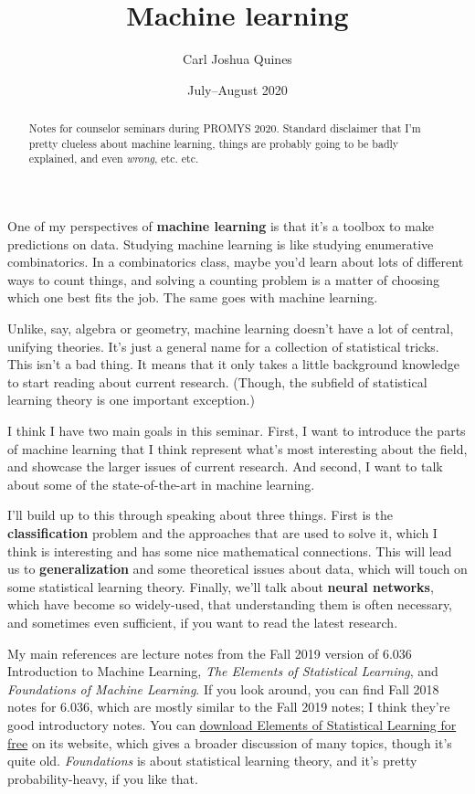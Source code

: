 \documentclass[11pt,paper=letter]{scrartcl}
\begin{document}
\title{Machine learning}
\author{Carl Joshua Quines}
\date{July--August 2020}

\maketitle

\begin{abstract}
Notes for counselor seminars during PROMYS 2020. Standard disclaimer that I'm pretty clueless about machine learning, things are probably going to be badly explained, and even \textit{wrong}, etc. etc.
\end{abstract}

One of my perspectives of \textbf{machine learning} is that it's a toolbox to make predictions on data. Studying machine learning is like studying enumerative combinatorics. In a combinatorics class, maybe you'd learn about lots of different ways to count things, and solving a counting problem is a matter of choosing which one best fits the job. The same goes with machine learning.

Unlike, say, algebra or geometry, machine learning doesn't have a lot of central, unifying theories. It's just a general name for a collection of statistical tricks. This isn't a bad thing. It means that it only takes a little background knowledge to start reading about current research. (Though, the subfield of statistical learning theory is one important exception.)

I think I have two main goals in this seminar. First, I want to introduce the parts of machine learning that I think represent what's most interesting about the field, and showcase the larger issues of current research. And second, I want to talk about some of the state-of-the-art in machine learning.

I'll build up to this through speaking about three things. First is the \textbf{classification} problem and the approaches that are used to solve it, which I think is interesting and has some nice mathematical connections. This will lead us to \textbf{generalization} and some theoretical issues about data, which will touch on some statistical learning theory. Finally, we'll talk about \textbf{neural networks}, which have become so widely-used, that understanding them is often necessary, and sometimes even sufficient, if you want to read the latest research.

My main references are lecture notes from the Fall 2019 version of 6.036 Introduction to Machine Learning, \textit{The Elements of Statistical Learning}, and \textit{Foundations of Machine Learning}. If you look around, you can find Fall 2018 notes for 6.036, which are mostly similar to the Fall 2019 notes; I think they're good introductory notes. You can \href{https://web.stanford.edu/~hastie/ElemStatLearn//}{download Elements of Statistical Learning for free} on its website, which gives a broader discussion of many topics, though it's quite old. \textit{Foundations} is about statistical learning theory, and it's pretty probability-heavy, if you like that.
\end{document}
